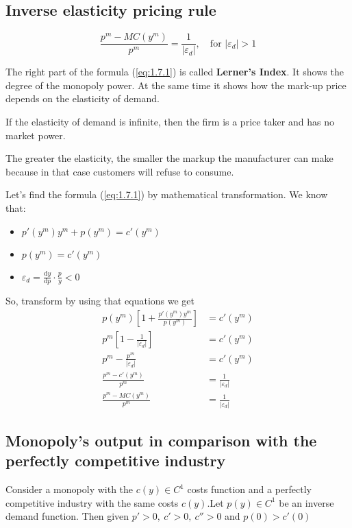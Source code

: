 \documentclass[a4paper, 10pt]{article}
\begin{document}
\subsection{Inverse elasticity pricing rule}
\begin{equation}\label{eq:1.7.1}
    \frac{p^m-MC(y^m)}{p^m}=\frac{1}{|\varepsilon_d|},\quad \text{for }|\varepsilon_d|>1
\end{equation}

The right part of the formula (\ref{eq:1.7.1}) is called \textbf{Lerner's Index}. It shows the degree of the monopoly power. At the same time it shows how the mark-up price depends on the elasticity of demand. 

\comment If the elasticity of demand is infinite, then the firm is a price taker and has no market power.

\comment The greater the elasticity, the smaller the markup the manufacturer can make because in that case customers will refuse to consume.

Let's find the formula (\ref{eq:1.7.1}) by mathematical transformation. We know that:
\begin{itemize}
    \item $p'(y^m)y^m+p(y^m)=c'(y^m)$
    \item $p(y^m)=c'(y^m)$
    \item $\varepsilon_d=\displaystyle\frac{\text{d}y}{\text{d} p}\cdot\frac{p}{y}<0$
\end{itemize}
So, transform by using that equations we get
$$\begin{aligned}
    p(y^m)\left[1+\displaystyle\frac{p'(y^m)y^m}{p(y^m)}\right]&=c'(y^m)\\
    p^m\left[1-\displaystyle\frac{1}{|\varepsilon_d|}\right]&=c'(y^m)\\
    p^m-\displaystyle\frac{p^m}{|\varepsilon_d|}&=c'(y^m)\\
    \displaystyle\frac{p^m-c'(y^m)}{p^m}&=\frac{1}{|\varepsilon_d|}\\
    \frac{p^m-MC(y^m)}{p^m}&=\frac{1}{|\varepsilon_d|}
\end{aligned}$$

\subsection{Monopoly's output in comparison with the perfectly competitive industry}
Consider a monopoly with the $c(y) \in C^1$ costs function and a perfectly competitive industry with the same costs $c(y)$.Let $p(y) \in C^1$ be an inverse demand function. Then given $p' > 0,\ c' > 0,\ c'' > 0$ and $p(0) > c'(0)$
\end{document}
